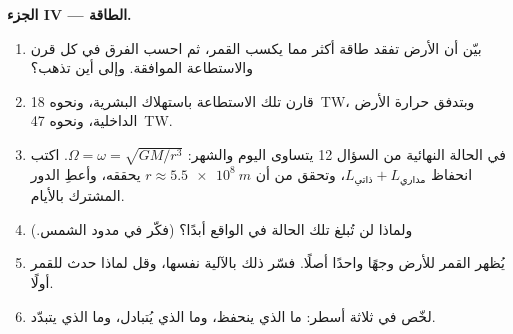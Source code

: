 \begin{problem}
\medskip
\noindent\textbf{الجزء IV --- الطاقة.}
\begin{enumerate}[resume]
  \item بيّن أن الأرض تفقد طاقة أكثر مما يكسب القمر، ثم
        احسب الفرق في كل قرن والاستطاعة الموافقة.
        وإلى أين تذهب؟
  \item قارن تلك الاستطاعة باستهلاك البشرية، ونحوه
        \qty{18}{TW}، وبتدفق حرارة الأرض الداخلية، ونحوه
        \qty{47}{TW}.
  \item في الحالة النهائية من السؤال 12 يتساوى اليوم والشهر:
        $\Omega = \omega = \sqrt{GM/r^3}$. اكتب انحفاظ
        $L_{\text{ذاتي}} + L_{\text{مداري}}$، وتحقق من أن $r \approx
        \qty{5.5e8}{m}$ يحققه، وأعطِ الدور المشترك بالأيام.
  \item ولماذا لن تُبلغ تلك الحالة في الواقع أبدًا؟ (فكّر في مدود
        الشمس.)
  \item يُظهر القمر للأرض وجهًا واحدًا أصلًا. فسّر ذلك بالآلية
        نفسها، وقل لماذا حدث للقمر أولًا.
  \item لخّص في ثلاثة أسطر: ما الذي ينحفظ، وما الذي يُتبادل،
        وما الذي يتبدّد.
\end{enumerate}
\end{problem}
